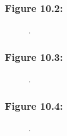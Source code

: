 \documentclass[t]{beamer}\usepackage[]{graphicx}\usepackage[]{color}
\begin{document}
\begin{frame}[label=Figure_10_2]
\frametitle{Figure 10.2: }
\begin{figure}[t]
\begin{minipage}[b]{\textwidth}
\centering

\caption{.}
\end{minipage}
\end{figure}
\end{frame}


\begin{frame}[label=Figure_10_3]
\frametitle{Figure 10.3: }
\begin{figure}[t]
\begin{minipage}[b]{\textwidth}
\centering

\caption{.}
\end{minipage}
\end{figure}
\end{frame}


\begin{frame}[label=Figure_10_4]
\frametitle{Figure 10.4: }
\begin{figure}[t]
\begin{minipage}[b]{\textwidth}
\centering

\caption{.}
\end{minipage}
\end{figure}
\end{frame}
\end{document}
